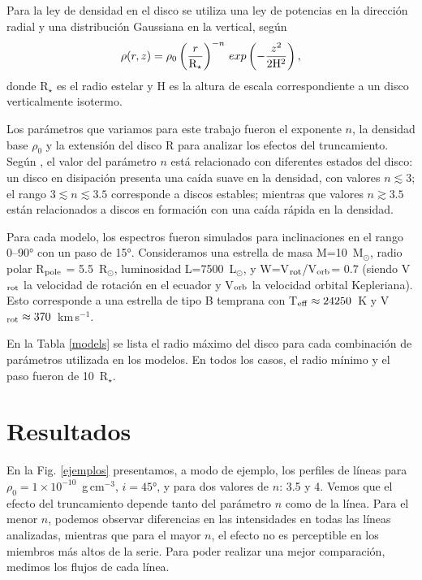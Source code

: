 \documentclass[baaa]{baaa}
\begin{document}
Para la ley de densidad en el disco se utiliza una ley de potencias en la direcci\'on radial y una distribuci\'on Gaussiana en la vertical, seg\'un
\begin{equation}
\rho(r,z) = \rho_0 \left(\frac{r}{\rm{R}_{\star}}\right)^{-n}\,exp\left( -\frac{z^2}{2\rm{H}^2} \right),
\end{equation}
donde R$_{\star}$ es el radio estelar y H es la altura de escala correspondiente a un disco verticalmente isotermo. 

Los par\'ametros que variamos para este trabajo fueron el exponente $n$, la densidad base $\rho_0$ y la extensi\'on del disco R para analizar los efectos del truncamiento. Seg\'un \citet{Vieira2017}, el valor del par\'ametro $n$ est\'a relacionado con diferentes estados del disco: un disco en disipaci\'on presenta una ca\'ida suave en la densidad, con valores $n\lesssim 3$; el rango $3\lesssim n \lesssim 3.5$ corresponde a discos estables; mientras que valores $n\gtrsim 3.5$ est\'an relacionados a discos en formaci\'on con una ca\'ida r\'apida en la densidad. 

Para cada modelo, los espectros fueron simulados para inclinaciones en el rango 0--90° con un paso de 15°. Consideramos una estrella de masa M=10~M$_{\odot}$, radio polar R$_{\rm pole}$ = 5.5~R$_{\odot}$, luminosidad L=7500~L$_{\odot}$, y W=V$_{\rm rot}$/V$_{\rm orb}$= 0.7 (siendo V$_{\rm rot}$ la velocidad de rotaci\'on en el ecuador y V$_{\rm orb}$ la velocidad orbital Kepleriana). Esto corresponde a una estrella de tipo B temprana con T$_{\rm eff}\approx 24250$~K y V$_{\rm rot}\approx370$~km\,s$^{-1}$.

En la Tabla \ref{models} se lista el radio m\'aximo del disco para cada combinaci\'on de parámetros utilizada en los modelos. En todos los casos, el radio m\'inimo y el paso fueron de 10~R$_\star$. 

\section{Resultados}

En la Fig. \ref{ejemplos} presentamos, a modo de ejemplo, los perfiles de l\'ineas para $\rho_0=1\times10^{-10}$~g\,cm$^{-3}$, $i=45$°, y para dos valores de $n$: 3.5 y 4. Vemos que el efecto del truncamiento depende tanto del par\'ametro $n$ como de la l\'inea. Para el menor $n$, podemos observar diferencias en las intensidades en todas las l\'ineas analizadas, mientras que para el mayor $n$, el efecto no es perceptible en los miembros m\'as altos de la serie. Para poder realizar una mejor comparaci\'on, medimos los flujos de cada l\'inea.  
\end{document}
